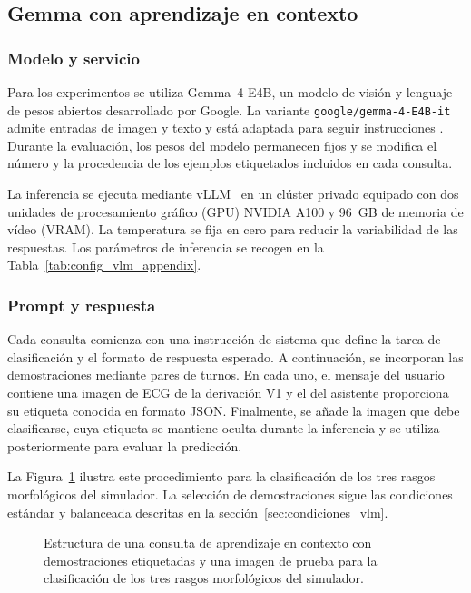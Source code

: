 \subsection{Gemma con aprendizaje en contexto}
\label{chap:vlm}

\subsubsection{Modelo y servicio}

Para los experimentos se utiliza Gemma~4 E4B, un modelo de visión y lenguaje de pesos abiertos desarrollado por Google. La variante \texttt{google/gemma-4-E4B-it} admite entradas de imagen y texto y está adaptada para seguir instrucciones \cite{gemma4card}. Durante la evaluación, los pesos del modelo permanecen fijos y se modifica el número y la procedencia de los ejemplos etiquetados incluidos en cada consulta.

La inferencia se ejecuta mediante vLLM~\cite{kwon2023vllm} en un clúster privado equipado con dos unidades de procesamiento gráfico (GPU) NVIDIA A100 y 96~GB de memoria de vídeo (VRAM). La temperatura se fija en cero para reducir la variabilidad de las respuestas. Los parámetros de inferencia se recogen en la Tabla~\ref{tab:config_vlm_appendix}.

\subsubsection{Prompt y respuesta}

Cada consulta comienza con una instrucción de sistema que define la tarea de clasificación y el formato de respuesta esperado. A continuación, se incorporan las demostraciones mediante pares de turnos. En cada uno, el mensaje del usuario contiene una imagen de ECG de la derivación V1 y el del asistente proporciona su etiqueta conocida en formato JSON. Finalmente, se añade la imagen que debe clasificarse, cuya etiqueta se mantiene oculta durante la inferencia y se utiliza posteriormente para evaluar la predicción.

La Figura~\ref{fig:icl_context_window} ilustra este procedimiento para la clasificación de los tres rasgos morfológicos del simulador. La selección de demostraciones sigue las condiciones estándar y balanceada descritas en la sección~\ref{sec:condiciones_vlm}.

\begin{figure}[H]
  \centering
  \caption{Estructura de una consulta de aprendizaje en contexto con demostraciones etiquetadas y una imagen de prueba para la clasificación de los tres rasgos morfológicos del simulador.}
  \label{fig:icl_context_window}
\end{figure}

